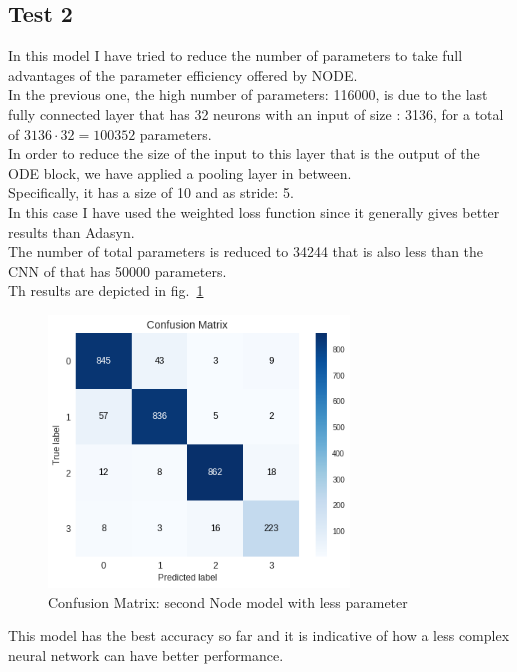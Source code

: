 \documentclass[LaM,binding=0.6cm]{sapthesis}
\begin{document}
\subsection{Test 2}
In this model I have tried to reduce the number of parameters to take full advantages of the parameter efficiency offered by NODE.\\In the previous one, the high number of parameters: 116000, is due to the last fully connected layer that has 32 neurons with an input of size : 3136, for a total of $3136 \cdot 32 = 100352$ parameters.\\In order to reduce the size of the input to this layer that is the output of the ODE block, we have applied a pooling layer in between.\\Specifically, it has a size of 10 and as stride: 5.\\In this case I have used the weighted loss function since it generally gives better results than Adasyn.\\The number of total parameters is reduced to 34244 that is also less than the CNN of \cite{cnnfazeli} that has 50000 parameters.\\Th results are depicted in fig.~\ref{fig:odelp} 
\begin{figure}[H]  \centering
    \includegraphics[width=80mm,scale=0.7]{odelp}
    \caption{Confusion Matrix: second Node model with less parameter}
    \label{fig:odelp}
\end{figure}
This model has the best accuracy so far and it is indicative of how a less complex neural network can have better performance.
\end{document}
